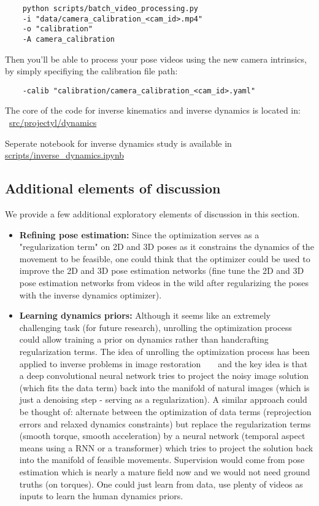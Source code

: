 \begin{verbatim}
    python scripts/batch_video_processing.py
    -i "data/camera_calibration_<cam_id>.mp4"
    -o "calibration"
    -A camera_calibration
\end{verbatim}

Then you'll be able to process your pose videos using the new camera intrinsics, by simply specifiying
the calibration file path:
\begin{verbatim}
    -calib "calibration/camera_calibration_<cam_id>.yaml"
\end{verbatim}

The core of the code for inverse kinematics and inverse dynamics is located in:
~\href{https://github.com/balthazarneveu/monocular_pose_and_forces_estimation/tree/main/src/projectyl/dynamics}{src/projectyl/dynamics}

Seperate notebook for inverse dynamics study is available in 
\href{https://github.com/balthazarneveu/monocular_pose_and_forces_estimation/blob/main/scripts/inverse_dynamics.ipynb}{scripts/inverse\_dynamics.ipynb}

\subsection{Additional elements of discussion}
\label{app:additional_discussion}
We provide a few additional exploratory elements of discussion in this section.
\begin{itemize}
\item \textbf{Refining pose estimation: } Since the optimization serves as a "regularization term" on 2D and 3D poses as it constrains the dynamics of the movement to be feasible,
one could think that the optimizer could be used to improve the 2D and 3D pose estimation networks (fine tune the 2D and 3D pose estimation networks from videos in the wild
after regularizing the poses with the inverse dynamics optimizer).

\item \textbf{Learning dynamics priors:}  Although it seems like an extremely challenging task (for future research), unrolling the optimization process could allow 
training a prior on dynamics rather than handcrafting regularization terms. The idea of unrolling the optimization process has been applied
to inverse problems in image restoration ~\cite{lecouat2021lucaskanade} ~\cite{Venkatakrishnan20135292013PP} and
the key idea is that a deep convolutional neural network tries to project the noisy image solution (which fits the data term) back into the manifold of natural images (which is just a denoising step - serving as a regularization).
A similar approach could be thought of: alternate between the optimization of data terms (reprojection errors and relaxed dynamics constraints) 
but replace the regularization terms (smooth torque, smooth acceleration) by a neural network (temporal aspect means using a RNN or a transformer) which tries to project 
the solution back into the manifold of feasible movements. Supervision would come from pose estimation which is nearly a mature field now and we would not need ground truths (on torques).
One could just learn from data, use plenty of videos as inputs to learn the human dynamics priors.
\end{itemize}